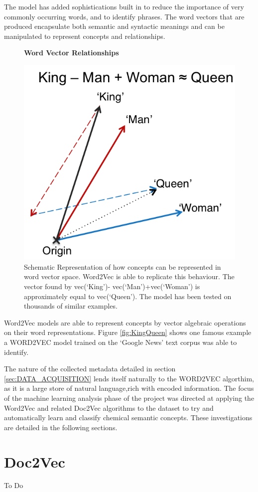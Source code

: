 The model has added sophistications built in to reduce the importance of very commonly occurring words, and to identify phrases. The word vectors that are produced encapsulate both semantic and syntactic meanings and can be manipulated to represent concepts and relationships.
\begin{figure}[H]
    \centering
    \textbf{Word Vector Relationships}\par\medskip
    \includegraphics[scale=0.8]{Natural_Language_Processing/KINGQUEEN.png}
    \caption{Schematic Representation of how concepts can be represented in word vector space. Word2Vec is able to replicate this behaviour. The vector found by vec(‘King’)- vec(‘Man’)+vec(‘Woman’) is approximately equal to vec(‘Queen’). The model has been tested on thousands of similar examples\cite{word2vec2}\cite{word2veckingqueen}.}
     \label{fig:KINGQUEEN}
\end{figure}
Word2Vec models are able to represent concepts by vector algebraic operations on their word representations. Figure \ref{fig:KingQueen} shows one famous example a WORD2VEC model trained on the `Google News' text corpus was able to identify. 

The nature of the collected metadata detailed in section \ref{sec:DATA_ACQUISITION} lends itself naturally to the WORD2VEC algorthim, as it is a large store of natural language,rich with encoded information. The focus of the machine learning analysis phase of the project was directed at applying the Word2Vec and related Doc2Vec algorithms to the dataset to try and automatically learn and classify chemical semantic concepts. These investigations are detailed in the following sections.
\section{Doc2Vec}
To Do